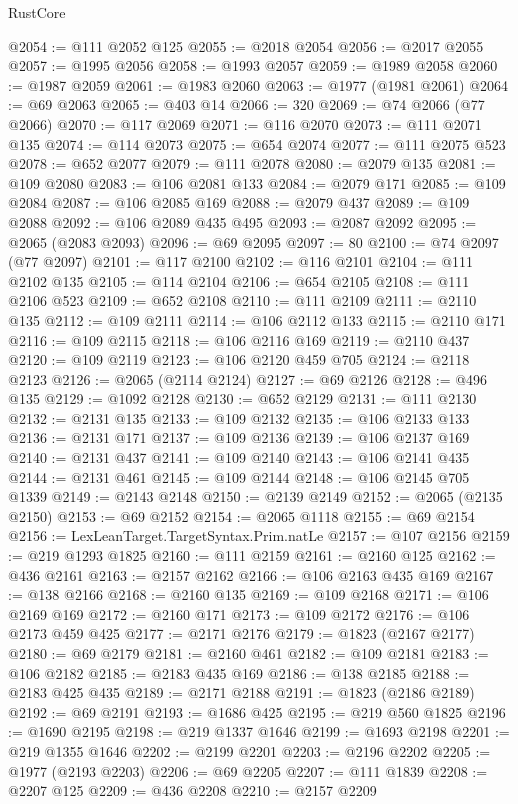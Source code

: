\begin{lexlean}{RustCore}
\begin{coremodule}
@2054 := @111 @2052 @125
@2055 := @2018 @2054
@2056 := @2017 @2055
@2057 := @1995 @2056
@2058 := @1993 @2057
@2059 := @1989 @2058
@2060 := @1987 @2059
@2061 := @1983 @2060
@2063 := @1977 (@1981 @2061)
@2064 := @69 @2063
@2065 := @403 @14
@2066 := 320
@2069 := @74 @2066 (@77 @2066)
@2070 := @117 @2069
@2071 := @116 @2070
@2073 := @111 @2071 @135
@2074 := @114 @2073
@2075 := @654 @2074
@2077 := @111 @2075 @523
@2078 := @652 @2077
@2079 := @111 @2078
@2080 := @2079 @135
@2081 := @109 @2080
@2083 := @106 @2081 @133
@2084 := @2079 @171
@2085 := @109 @2084
@2087 := @106 @2085 @169
@2088 := @2079 @437
@2089 := @109 @2088
@2092 := @106 @2089 @435 @495
@2093 := @2087 @2092
@2095 := @2065 (@2083 @2093)
@2096 := @69 @2095
@2097 := 80
@2100 := @74 @2097 (@77 @2097)
@2101 := @117 @2100
@2102 := @116 @2101
@2104 := @111 @2102 @135
@2105 := @114 @2104
@2106 := @654 @2105
@2108 := @111 @2106 @523
@2109 := @652 @2108
@2110 := @111 @2109
@2111 := @2110 @135
@2112 := @109 @2111
@2114 := @106 @2112 @133
@2115 := @2110 @171
@2116 := @109 @2115
@2118 := @106 @2116 @169
@2119 := @2110 @437
@2120 := @109 @2119
@2123 := @106 @2120 @459 @705
@2124 := @2118 @2123
@2126 := @2065 (@2114 @2124)
@2127 := @69 @2126
@2128 := @496 @135
@2129 := @1092 @2128
@2130 := @652 @2129
@2131 := @111 @2130
@2132 := @2131 @135
@2133 := @109 @2132
@2135 := @106 @2133 @133
@2136 := @2131 @171
@2137 := @109 @2136
@2139 := @106 @2137 @169
@2140 := @2131 @437
@2141 := @109 @2140
@2143 := @106 @2141 @435
@2144 := @2131 @461
@2145 := @109 @2144
@2148 := @106 @2145 @705 @1339
@2149 := @2143 @2148
@2150 := @2139 @2149
@2152 := @2065 (@2135 @2150)
@2153 := @69 @2152
@2154 := @2065 @1118
@2155 := @69 @2154
@2156 := LexLeanTarget.TargetSyntax.Prim.natLe
@2157 := @107 @2156
@2159 := @219 @1293 @1825
@2160 := @111 @2159
@2161 := @2160 @125
@2162 := @436 @2161
@2163 := @2157 @2162
@2166 := @106 @2163 @435 @169
@2167 := @138 @2166
@2168 := @2160 @135
@2169 := @109 @2168
@2171 := @106 @2169 @169
@2172 := @2160 @171
@2173 := @109 @2172
@2176 := @106 @2173 @459 @425
@2177 := @2171 @2176
@2179 := @1823 (@2167 @2177)
@2180 := @69 @2179
@2181 := @2160 @461
@2182 := @109 @2181
@2183 := @106 @2182
@2185 := @2183 @435 @169
@2186 := @138 @2185
@2188 := @2183 @425 @435
@2189 := @2171 @2188
@2191 := @1823 (@2186 @2189)
@2192 := @69 @2191
@2193 := @1686 @425
@2195 := @219 @560 @1825
@2196 := @1690 @2195
@2198 := @219 @1337 @1646
@2199 := @1693 @2198
@2201 := @219 @1355 @1646
@2202 := @2199 @2201
@2203 := @2196 @2202
@2205 := @1977 (@2193 @2203)
@2206 := @69 @2205
@2207 := @111 @1839
@2208 := @2207 @125
@2209 := @436 @2208
@2210 := @2157 @2209

\end{coremodule}
\end{lexlean}
